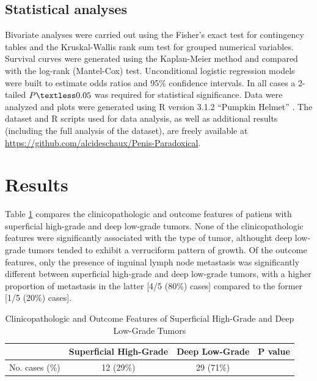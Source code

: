 \documentclass[11pt,letterpaper]{article}\usepackage[]{graphicx}\usepackage[]{color}
\begin{document}
\begin{multicols}{2}
\subsection*{Statistical analyses}
Bivariate analyses were carried out using the Fisher's exact test for contingency tables and the Kruskal-Wallis rank sum test for grouped numerical variables. Survival curves were generated using the Kaplan-Meier method and compared with the log-rank (Mantel-Cox) test. Unconditional logistic regression models were built to estimate odds ratios and 95\% confidence intervals. In all cases a 2-tailed $P\textless 0.05$ was required for statistical significance. Data were analyzed and plots were generated using R version 3.1.2 ``Pumpkin Helmet'' \cite{RCoreTeam}. The dataset and R scripts used for data analysis, as well as additional results (including the full analysis of the dataset), are freely available at \url{https://github.com/alcideschaux/Penis-Paradoxical}.

\section*{Results}
Table \ref{Table_Distribution} compares the clinicopathologic and outcome features of patiens with superficial high-grade and deep low-grade tumors. None of the clinicopathologic features were significantly associated with the type of tumor, althought deep low-grade tumors tended to exhibit a verruciform pattern of growth. Of the outcome features, only the presence of inguinal lymph node metastasis was significantly different between superficial high-grade and deep low-grade tumors, with a higher proportion of metastasis in the latter [4/5 (80\%) cases] compared to the former [1/5 (20\%) cases].

\begin{table}
\centering
\caption{Clinicopathologic and Outcome Features of Superficial High-Grade and Deep Low-Grade Tumors}
\label{Table_Distribution}
\begin{tabular}{lccl}
\hline
~ & \textbf{Superficial High-Grade} & \textbf{Deep Low-Grade} & \textbf{P value} \\
\hline
No. cases (\%)  & 12 (29\%)
                & 29 (71\%)
                & ~ \\


\end{tabular}
\end{table}
\end{multicols}
\end{document}
